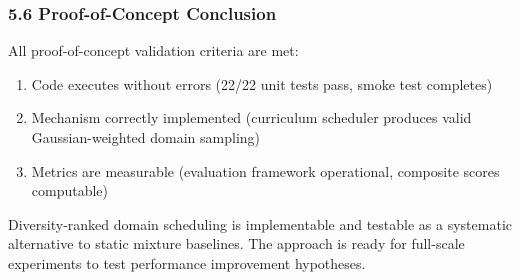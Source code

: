 \subsubsection{5.6 Proof-of-Concept Conclusion}

All proof-of-concept validation criteria are met:
\begin{enumerate}
\item Code executes without errors (22/22 unit tests pass, smoke test completes)
\item Mechanism correctly implemented (curriculum scheduler produces valid Gaussian-weighted domain sampling)
\item Metrics are measurable (evaluation framework operational, composite scores computable)
\end{enumerate}

Diversity-ranked domain scheduling is implementable and testable as a systematic alternative to static mixture baselines. The approach is ready for full-scale experiments to test performance improvement hypotheses.
